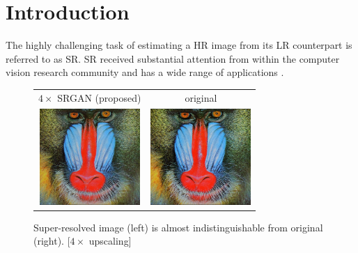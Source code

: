\documentclass[10pt,twocolumn,letterpaper]{article}
\begin{document}
\section{Introduction}
The highly challenging task of estimating a \ac{HR} image from its \ac{LR} counterpart is referred to as \ac{SR}.
	\ac{SR} received substantial attention from within the computer vision research community and has a wide range of applications \cite{yang2007spatial,Zou12,Nasrollahi2014}.

\begin{figure}[ht] 
  	\begin{tabular}{cc}
  		$4\times$ SRGAN (proposed) & original \\
     	\includegraphics[trim=0 0 0 0, clip, width=1.5in]{images/used/jpg/baboon_SRGAN-VGG54} &
     	\includegraphics[trim=0 0 0 0, clip, width=1.5in]{images/used/jpg/baboon_HR} \\
     	
  	\end{tabular}
	\caption{Super-resolved image (left) is almost indistinguishable from original (right). [$4\times$ upscaling]} 
	\label{fig:exampleIntroFirst}
\end{figure}
\end{document}

